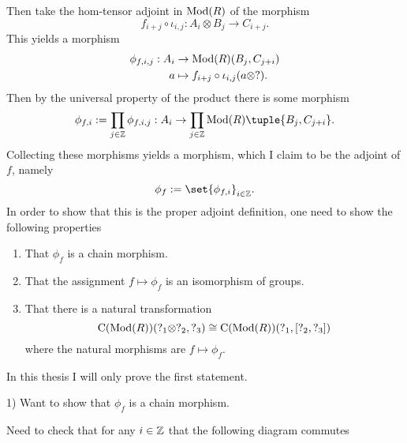 \begin{remark}
    Then take the hom-tensor adjoint in \( \operatorname{Mod}(R) \) of the morphism
    \[
        f_{i + j} \circ \iota_{i, j}: A_i \otimes B_j \to C_{i + j}.
    \]
    This yields a morphism
    \begin{align*}
        \phi_{f, i, j}: A_i &\to \operatorname{Mod}(R)(B_j, C_{j + i}) \\
        a &\mapsto f_{i + j} \circ \iota_{i, j}(a \otimes ?).
    \end{align*}
    Then by the universal property of the product there is some morphism
    \[
        \phi_{f, i} := \prod_{j \in \Zb} \phi_{f, i, j}: A_i \to \prod_{j \in \Zb} \Mod(R)\tuple{B_j, C_{j + i}}.
    \]
    Collecting these morphisms yields a morphism, which I claim to be the adjoint of \( f \), namely 
    \[
        \phi_f := \set{\phi_{f, i}}_{i \in \Zb}.
    \]
    In order to show that this is the proper adjoint definition, one need to show the following properties
    \begin{enumerate}
        \item {
            That \( \phi_f \) is a chain morphism.
        }
        \item {
            That the assignment \( f \mapsto \phi_f \) is an isomorphism of groups.
        }
        \item {
            That there is a natural transformation
            \[
                \operatorname{C}(\operatorname{Mod}(R))(?_1 \otimes ?_2, ?_3) \cong \operatorname{C}(\operatorname{Mod}(R))(?_1, \left[ ?_2, ?_3 \right])
            \]
            where the natural morphisms are \( f \mapsto \phi_f \).
        }
    \end{enumerate}
    In this thesis I will only prove the first statement.

    1) Want to show that \( \phi_f \) is a chain morphism.

    Need to check that for any \( i \in {\mathbb{Z}} \) that the following diagram commutes
    \begin{center}
\end{center}
\end{remark}
